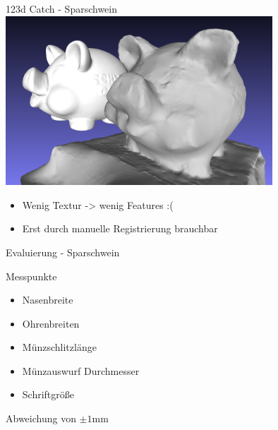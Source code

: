 \documentclass[11pt]{beamer}
\begin{document}
\begin{frame}{123d Catch - Sparschwein}
\center
	\includegraphics[width=10cm]{images/sparschwein/123d_Vergleich}
	\begin{block}{}
		\begin{itemize}
			\item Wenig Textur -> wenig Features :(
			\item Erst durch manuelle Registrierung brauchbar
		\end{itemize}
	\end{block}
\end{frame}

\begin{frame}{Evaluierung - Sparschwein}
	\begin{block}{Messpunkte}
		\begin{itemize}
			\item Nasenbreite
			\item Ohrenbreiten
			\item Münzschlitzlänge
			\item Münzauswurf Durchmesser
			\item Schriftgröße
		\end{itemize}
	\end{block}
	\begin{block}{}
		Abweichung von $\pm1$mm
	\end{block}
\end{frame}
\end{document}
